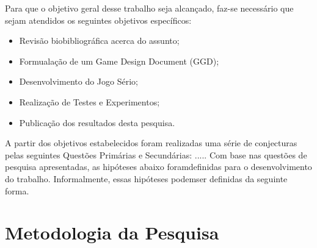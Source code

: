 




Para que o objetivo geral desse trabalho seja alcançado, faz-se necessário que sejam atendidos os seguintes objetivos específicos: 

\begin{itemize}
    \item Revisão biobibliográfica acerca do assunto;
    \item Formualação de um Game Design Document (GGD);
    \item Desenvolvimento do Jogo Sério;
    \item Realização de Testes e Experimentos;
    \item Publicação dos resultados desta pesquisa.
 \end{itemize}

 A partir dos objetivos estabelecidos foram realizadas uma série de conjecturas pelas seguintes Questões Primárias e Secundárias: ..... Com base nas questões de pesquisa apresentadas, as hipóteses abaixo foramdefinidas para o desenvolvimento do trabalho. Informalmente, essas hipóteses podemser definidas da seguinte forma.


\section{Metodologia da Pesquisa}\label{sec:metodologia}


